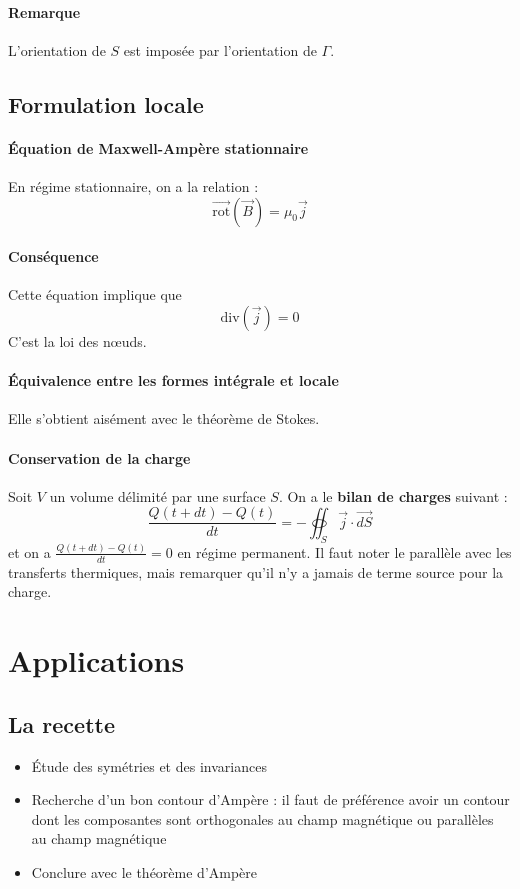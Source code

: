 \documentclass[french]{book}
\theoremstyle{plain}
\theoremstyle{definition}
\theoremstyle{remark}
\newcommand{\rot}{\overrightarrow{\text{rot}}}
\renewcommand{\div}{\text{div}}
\begin{document}
\paragraph{Remarque} L'orientation de $S$ est imposée par l'orientation de $\Gamma$.
\subsection{Formulation locale}
\paragraph{Équation de Maxwell-Ampère stationnaire} En régime stationnaire, on a la relation : $$\rot\left(\overrightarrow{B}\right)=\mu_0\overrightarrow{j}$$
\paragraph{Conséquence} Cette équation implique que $$\div\left(\overrightarrow{j}\right)=0$$ C'est la loi des nœuds.
\paragraph{Équivalence entre les formes intégrale et locale} Elle s'obtient aisément avec le théorème de Stokes.
\paragraph{Conservation de la charge} Soit $V$ un volume délimité par une surface $S$. On a le \textbf{bilan de charges} suivant : $$\frac{Q(t+dt)-Q(t)}{dt}=-\oiint_S\overrightarrow{j}\cdot\overrightarrow{dS}$$ et on a $\displaystyle\frac{Q(t+dt)-Q(t)}{dt}=0$ en régime permanent. Il faut noter le parallèle avec les transferts thermiques, mais remarquer qu'il n'y a jamais de terme source pour la charge.
\section{Applications}
\subsection{La recette}
\begin{itemize}
	\item Étude des symétries et des invariances
	\item Recherche d'un bon contour d'Ampère : il faut de préférence avoir un contour dont les composantes sont orthogonales au champ magnétique ou parallèles au champ magnétique
	\item Conclure avec le théorème d'Ampère
\end{itemize}
\end{document}
